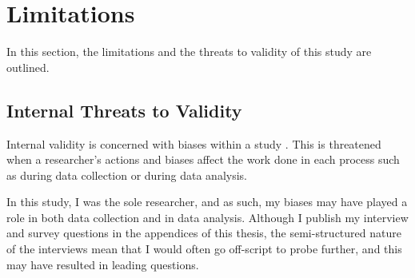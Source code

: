 


\section{Limitations}
In this section, the limitations and the threats to validity of this study are outlined.

\subsection{Internal Threats to Validity}
Internal validity is concerned with biases within a study \cite{creswell2013research}. This is threatened when a researcher's actions and biases affect the work done in each process such as during data collection or during data analysis.

In this study, I was the sole researcher, and as such, my biases may have played a role in both data collection and in data analysis. Although I publish my interview and survey questions in the appendices of this thesis, the semi-structured nature of the interviews mean that I would often go off-script to probe further, and this may have resulted in leading questions.


